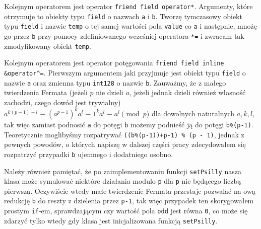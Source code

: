 \documentclass{article}
\begin{document}
Kolejnym operatorem jest operator \texttt{friend field operator*}. Argumenty, które otrzymuje
to obiekty typu \texttt{field} o nazwach \texttt{a} i \texttt{b}. Tworzę tymczasowy obiekt typu \texttt{field} i nazwie \texttt{temp}
o tej samej wartości pola \texttt{value} co \texttt{a} i następnie, mnożę go przez \texttt{b} przy pomocy
zdefiniowanego wcześniej operatora \texttt{*=} i zwracam tak zmodyfikowany obiekt \texttt{temp}.

Kolejnym operatorem jest operator potęgowania \texttt{friend field inline \&operator}\verb!^!\texttt{=}. 
Pierwszym argumentem jaki przyjmuje jest obiekt typu \texttt{field} o nazwie \texttt{a} oraz zmienna typu 
\texttt{\textunderscore \textunderscore int128} o
nazwie \texttt{b}. Zauważmy, że z małego twierdzenia Fermata (jeżeli $p$ nie dzieli $a$, jeżeli jednak dzieli również własność zachodzi, 
czego dowód jest trywialny) $a^{k(p-1)+l} \equiv (a^{p-1})^ka^l \equiv 1^ka^l \equiv a^l \pmod p$ dla dowolnych naturalnych
$a,k,l$, tak więc
zamiast podnosić \texttt{a} do potęgi \texttt{b} możemy podnieść ją do potęgi \texttt{b\%(p-1)}.
Teoretycznie moglibyśmy rozpatrywać \texttt{((b\%(p-1))+p-1) \% (p - 1)}, jednak z pewnych powodów, o 
których napiszę w dalszej części pracy zdecydowałem się rozpatrzyć przypadki \texttt{b} ujemnego i 
dodatniego osobno. 

Należy również pamiętać, że po zaimplementowaniu funkcji \texttt{setPsilly}
nasza klasa może symulować niektóre działania modulo \texttt{p} dla \texttt{p}
nie będącego liczbą pierwszą. Oczywiście wtedy małe twierdzenie Fermata
przestaje pozwalać na ową redukcję \texttt{b} do reszty z dzielenia przez
\texttt{p-1}, tak więc przypadek ten skorygowałem prostym \texttt{if}-em, sprawdzającym 
czy wartość pola \texttt{odd} jest równa \texttt{0}, co może się zdarzyć tylko wtedy gdy klasa 
jest inicjalizowana funkcją \texttt{setPsilly}.
\end{document}
